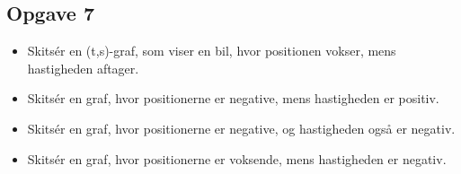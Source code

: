 \documentclass[a4paper, 12pt]{article}
\begin{document}
\subsection*{Opgave 7}
\label{sec:org2949c68}

\begin{itemize}
\item Skitsér en (t,s)-graf, som viser en bil, hvor positionen vokser, mens hastigheden aftager.

\item Skitsér en graf, hvor positionerne er negative, mens hastigheden er positiv.

\item Skitsér en graf, hvor positionerne er negative, og hastigheden også er negativ.

\item Skitsér en graf, hvor positionerne er voksende, mens hastigheden er negativ.
\end{itemize}
\end{document}
